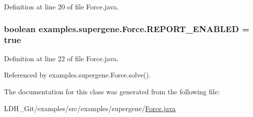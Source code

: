 Definition at line 20 of file Force.\-java.

\hypertarget{classexamples_1_1supergene_1_1_force_a1f3ab7a80a1419be7862d341e3ca63f9}{
\subsubsection[{R\-E\-P\-O\-R\-T\-\_\-\-E\-N\-A\-B\-L\-E\-D}]{\setlength{\rightskip}{0pt plus 5cm}boolean examples.\-supergene.\-Force.\-R\-E\-P\-O\-R\-T\-\_\-\-E\-N\-A\-B\-L\-E\-D = true\hspace{0.3cm}{\ttfamily [static]}}}\label{classexamples_1_1supergene_1_1_force_a1f3ab7a80a1419be7862d341e3ca63f9}


Definition at line 22 of file Force.\-java.



Referenced by examples.\-supergene.\-Force.\-solve().



The documentation for this class was generated from the following file\-:\begin{DoxyCompactItemize}
\item 
L\-D\-H\-\_\-\-Git/examples/src/examples/supergene/\hyperlink{_force_8java}{Force.\-java}\end{DoxyCompactItemize}
